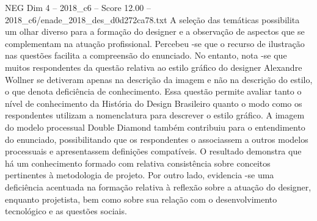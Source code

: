 \begin{textsample}{NEG Dim 4 – 2018\_c6 – Score 12.00 – 2018\_c6/enade\_2018\_des\_d0d272ca78.txt}
A seleção das temáticas possibilita um olhar diverso para a formação do designer e a observação de aspectos que se complementam na atuação profissional.
Percebeu -se que o recurso de ilustração nas questões facilita a compreensão do enunciado.
No entanto, nota -se que muitos respondentes da questão relativa ao estilo gráfico do designer Alexandre Wollner se detiveram apenas na descrição da imagem e não na descrição do estilo, o que denota deficiência de conhecimento.
Essa questão permite avaliar tanto o nível de conhecimento da História do Design Brasileiro quanto o modo como os respondentes utilizam a nomenclatura para descrever o estilo gráfico.
A imagem do modelo processual Double Diamond também contribuiu para o entendimento do enunciado, possibilitando que os respondentes o associassem a outros modelos processuais e apresentassem definições compatíveis.
O resultado demonstra que há um conhecimento formado com relativa consistência sobre conceitos pertinentes à metodologia de projeto.
Por outro lado, evidencia -se uma deficiência acentuada na formação relativa à reflexão sobre a atuação do designer, enquanto projetista, bem como sobre sua relação com o desenvolvimento tecnológico e as questões sociais.

\end{textsample}
